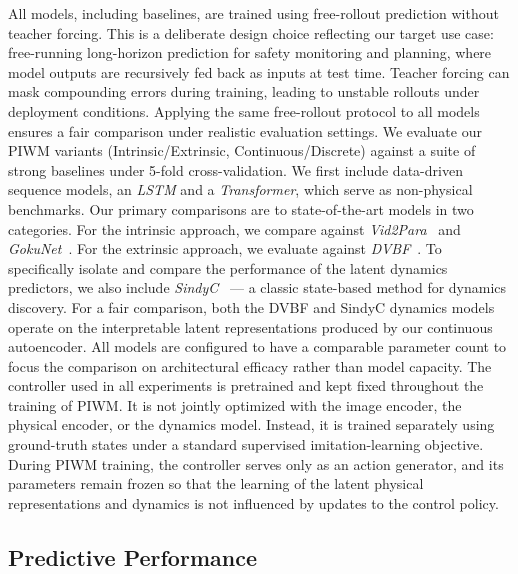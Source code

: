 \documentclass[nonacm,sigconf]{acmart}
\begin{document}
All models, including baselines, are trained using free-rollout prediction without teacher forcing. This is a deliberate design choice reflecting our target use case: free-running long-horizon prediction for safety monitoring and planning, where model outputs are recursively fed back as inputs at test time. Teacher forcing can mask compounding errors during training, leading to unstable rollouts under deployment conditions. Applying the same free-rollout protocol to all models ensures a fair comparison under realistic evaluation settings.
We evaluate our PIWM variants (Intrinsic/Extrinsic, Continuous/Discrete) against a suite of strong baselines under 5-fold cross-validation. We first include data-driven sequence models, an \textit{LSTM} and a \textit{Transformer}, which serve as non-physical benchmarks. Our primary comparisons are to state-of-the-art models in two categories. For the {intrinsic} approach, we compare against \textit{Vid2Para}~\cite[]{asenov2019vid2param} and \textit{GokuNet}~\cite[]{linial_generative_2021}. For the {extrinsic} approach, we evaluate against \textit{DVBF}~\cite[]{karl2016deep}. To specifically isolate and compare the performance of the latent dynamics predictors, we also include \textit{SindyC}~\cite[]{BRUNTON2016710} --- a classic state-based method for dynamics discovery. For a fair comparison, both the DVBF and SindyC dynamics models operate on the interpretable latent representations produced by our continuous autoencoder. All models are configured to have a comparable parameter count to focus the comparison on architectural efficacy rather than model capacity. The controller used in all experiments is pretrained and kept fixed throughout the training of PIWM. It is not jointly optimized with the image encoder, the physical encoder, or the dynamics model. Instead, it is trained separately using ground-truth states under a standard supervised imitation-learning objective. During PIWM training, the controller serves only as an action generator, and its parameters remain frozen so that the learning of the latent physical representations and dynamics is not influenced by updates to the control policy.



 
\subsection{Predictive Performance}
\end{document}
